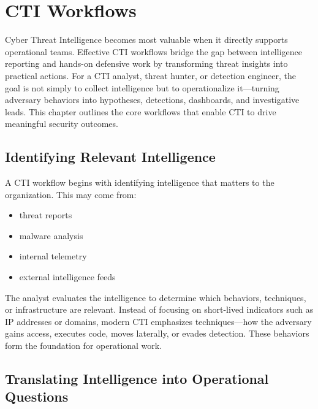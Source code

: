 \section{CTI Workflows}

Cyber Threat Intelligence becomes most valuable when it directly supports operational teams. Effective CTI workflows 
bridge the gap between intelligence reporting and hands-on defensive work by transforming threat insights into practical 
actions. For a CTI analyst, threat hunter, or detection engineer, the goal is not simply to collect intelligence but to 
operationalize it—turning adversary behaviors into hypotheses, detections, dashboards, and investigative leads. This 
chapter outlines the core workflows that enable CTI to drive meaningful security outcomes.


\subsection*{Identifying Relevant Intelligence}

A CTI workflow begins with identifying intelligence that matters to the organization. This may come from:

\begin{itemize}
    \item threat reports
    \item malware analysis
    \item internal telemetry
    \item external intelligence feeds
\end{itemize}

The analyst evaluates the intelligence to determine which behaviors, techniques, or infrastructure are relevant. 
Instead of focusing on short-lived indicators such as IP addresses or domains, modern CTI emphasizes techniques—how 
the adversary gains access, executes code, moves laterally, or evades detection. These behaviors form the foundation 
for operational work.


\subsection*{Translating Intelligence into Operational Questions}

